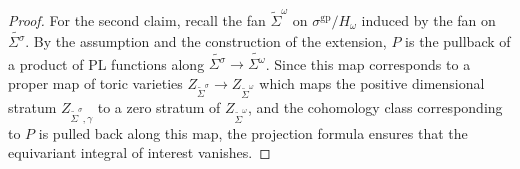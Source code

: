 \documentclass[12pt, oneside]{amsart}   	%
\newcommand{\gp}{\operatorname{gp}}
\numberwithin{equation}{section}
\numberwithin{thm}{section}
\numberwithin{figure}{section}
\begin{document}
\begin{proof}
For the second claim, recall the fan $\widetilde{\Sigma}^{\omega}$ on $\sigma^{\gp}/H_\omega$ induced by the fan on $\widetilde{\Sigma^{\sigma}}$. By the assumption and the construction of the extension, $P$ is the pullback of a product of PL functions along $\widetilde{\Sigma^{\sigma}} \rightarrow \widetilde{\Sigma^{\omega}}$. Since this map corresponds to a proper map of toric varieties $Z_{\widetilde{\Sigma}^{\sigma}} \rightarrow Z_{\widetilde{\Sigma}^{\omega}}$ which maps the positive dimensional stratum $Z_{\widetilde{\Sigma}^{\sigma},\gamma}$ to a zero stratum of $Z_{\widetilde{\Sigma}^{\omega}}$, and the cohomology class corresponding to $P$ is pulled back along this map, the projection formula ensures that the equivariant integral of interest vanishes. 



\end{proof}
\end{document}
